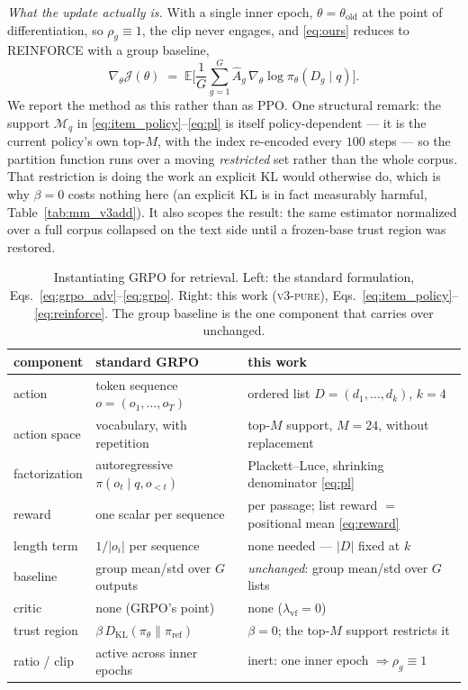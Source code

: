 \emph{What the update actually is.} With a single inner epoch, $\theta = \theta_{\mathrm{old}}$ at
the point of differentiation, so $\rho_g \equiv 1$, the clip never engages, and \eqref{eq:ours}
reduces to REINFORCE with a group baseline,
\begin{equation}
\nabla_\theta \mathcal{J}(\theta) \;=\; \mathbb{E}\Big[\frac{1}{G}\sum_{g=1}^{G}
\hat{A}_g \, \nabla_\theta \log \pi_\theta(D_g \mid q)\Big].
\label{eq:reinforce}
\end{equation}
We report the method as this rather than as PPO. One structural remark: the support
$\mathcal{M}_q$ in \eqref{eq:item_policy}--\eqref{eq:pl} is itself policy-dependent --- it is the
current policy's own top-$M$, with the index re-encoded every $100$ steps --- so the partition
function runs over a moving \emph{restricted} set rather than the whole corpus. That restriction
is doing the work an explicit KL would otherwise do, which is why $\beta{=}0$ costs nothing here
(an explicit KL is in fact measurably harmful, Table~\ref{tab:mm_v3add}). It also scopes the
result: the same estimator normalized over a full corpus collapsed on the text side until a
frozen-base trust region was restored.

\begin{table}[t]
\centering\small
\caption{Instantiating GRPO for retrieval. Left: the standard formulation, Eqs.\
\eqref{eq:grpo_adv}--\eqref{eq:grpo}. Right: this work (\textsc{v3-pure}), Eqs.\
\eqref{eq:item_policy}--\eqref{eq:reinforce}. The group baseline is the one component that
carries over unchanged.}
\label{tab:mm_grpo_map}
\begin{tabular}{lll}
\toprule
component & standard GRPO & this work \\
\midrule
action              & token sequence $o=(o_1,\dots,o_T)$ & ordered list $D=(d_1,\dots,d_k)$, $k{=}4$ \\
action space        & vocabulary, with repetition & top-$M$ support, $M{=}24$, without replacement \\
factorization       & autoregressive $\pi(o_t\mid q,o_{<t})$ & Plackett--Luce, shrinking denominator \eqref{eq:pl} \\
reward              & one scalar per sequence & per passage; list reward $=$ positional mean \eqref{eq:reward} \\
length term         & $1/|o_i|$ per sequence & none needed --- $|D|$ fixed at $k$ \\
baseline            & group mean/std over $G$ outputs & \emph{unchanged}: group mean/std over $G$ lists \\
critic              & none (GRPO's point) & none ($\lambda_{\mathrm{vf}}{=}0$) \\
trust region        & $\beta\,D_{\mathrm{KL}}(\pi_\theta\|\pi_{\mathrm{ref}})$ & $\beta{=}0$; the top-$M$ support restricts it \\
ratio / clip        & active across inner epochs & inert: one inner epoch $\Rightarrow \rho_g \equiv 1$ \\
\bottomrule
\end{tabular}
\end{table}

